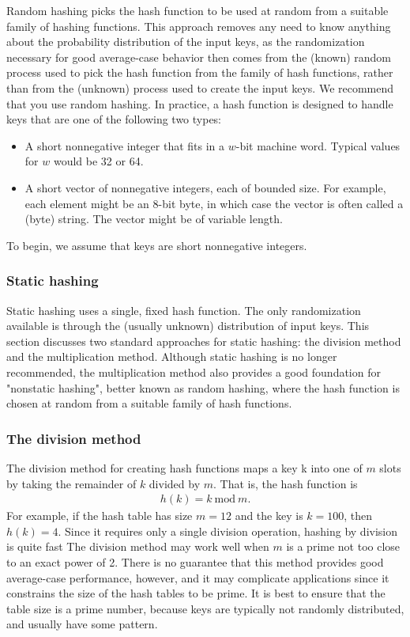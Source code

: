 \documentclass{report}
\begin{document}
Random hashing picks the hash function to be used at random from a suitable family of hashing functions. This approach removes any need to know anything about the probability distribution of the input keys, as the randomization necessary for good average-case behavior then comes from the (known) random process used to pick the hash function from the family of hash functions, rather than from the (unknown) process used to create the input keys. We recommend that you use random hashing. 
\bigbreak \noindent 
In practice, a hash function is designed to handle keys that are one of the following two types:
\begin{itemize}
    \item A short nonnegative integer that fits in a $w$-bit machine word. Typical values for $w$ would be 32 or 64.
    \item A short vector of nonnegative integers, each of bounded size. For example, each element might be an 8-bit byte, in which case the vector is often called a (byte) string. The vector might be of variable length. 
\end{itemize}
\bigbreak \noindent 
To begin, we assume that keys are short nonnegative integers.
\bigbreak \noindent 
\subsubsection{Static hashing}
\bigbreak \noindent 
Static hashing uses a single, fixed hash function. The only randomization available is through the (usually unknown) distribution of input keys. This section discusses two standard approaches for static hashing: the division method and the multiplication method. Although static hashing is no longer recommended, the multiplication method also provides a good foundation for "nonstatic hashing", better known as random hashing, where the hash function is chosen at random from a suitable family of hash functions.
\bigbreak \noindent 
\subsubsection{The division method}
\bigbreak \noindent 
The division method for creating hash functions maps a key k into one of $m$ slots
by taking the remainder of $k$ divided by $m$. That is, the hash function is
\begin{align*}
    h(k) = k \ \text{mod} \ m
.\end{align*}
\bigbreak \noindent 
For example, if the hash table has size $m=12 $ and the key is $k=100$, then $h(k) = 4$. Since it requires only a single division operation, hashing by division is quite fast
\bigbreak \noindent 
The division method may work well when $m$ is a prime not too close to an exact power of 2. There is no guarantee that this method provides good average-case performance, however, and it may complicate applications since it constrains the size of the hash tables to be prime.
\bigbreak \noindent 
It is best to ensure that the table size is a prime number,  because keys are typically not randomly distributed, and usually have some pattern.
\end{document}
